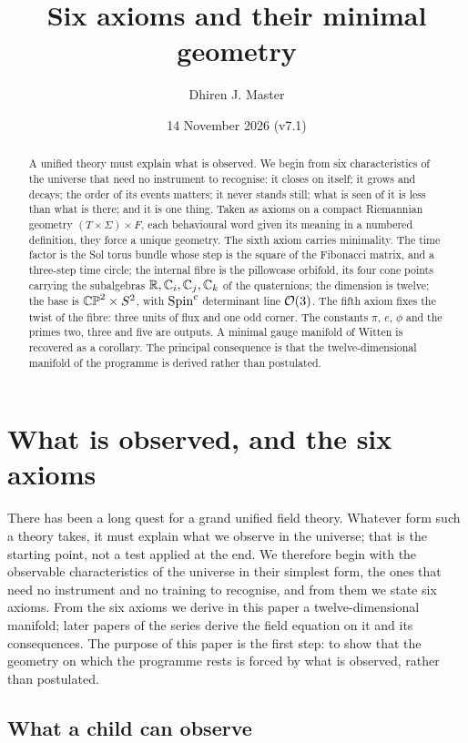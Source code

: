\documentclass[11pt,a4paper]{article}
\title{Six axioms and their minimal geometry}
\author{Dhiren J. Master}
\date{14 November 2026 (v7.1)}
\theoremstyle{plain}
\theoremstyle{definition}
\theoremstyle{remark}
\begin{document}
\maketitle

\begin{abstract}
A unified theory must explain what is observed. We begin from six characteristics of the universe that need no instrument to recognise: it closes on itself; it grows and decays; the order of its events matters; it never stands still; what is seen of it is less than what is there; and it is one thing. Taken as axioms on a compact Riemannian geometry $(T\times\Sigma)\times F$, each behavioural word given its meaning in a numbered definition, they force a unique geometry. The sixth axiom carries minimality. The time factor is the Sol torus bundle whose step is the square of the Fibonacci matrix, and a three-step time circle; the internal fibre is the pillowcase orbifold, its four cone points carrying the subalgebras $\mathbb{R},\mathbb{C}_i,\mathbb{C}_j,\mathbb{C}_k$ of the quaternions; the dimension is twelve; the base is $\mathbb{CP}^2\times S^2$, with $\text{Spin}^c$ determinant line $\mathcal{O}(3)$. The fifth axiom fixes the twist of the fibre: three units of flux and one odd corner. The constants $\pi$, $e$, $\phi$ and the primes two, three and five are outputs. A minimal gauge manifold of Witten is recovered as a corollary. The principal consequence is that the twelve-dimensional manifold of the programme is derived rather than postulated.
\end{abstract}

\section{What is observed, and the six axioms}\label{sec:intro}

There has been a long quest for a grand unified field theory. Whatever form such a theory takes, it must explain what we observe in the universe; that is the starting point, not a test applied at the end. We therefore begin with the observable characteristics of the universe in their simplest form, the ones that need no instrument and no training to recognise, and from them we state six axioms. From the six axioms we derive in this paper a twelve-dimensional manifold; later papers of the series derive the field equation on it and its consequences. The purpose of this paper is the first step: to show that the geometry on which the programme rests is forced by what is observed, rather than postulated.

\subsection{What a child can observe}\label{sec:observe}
\end{document}
